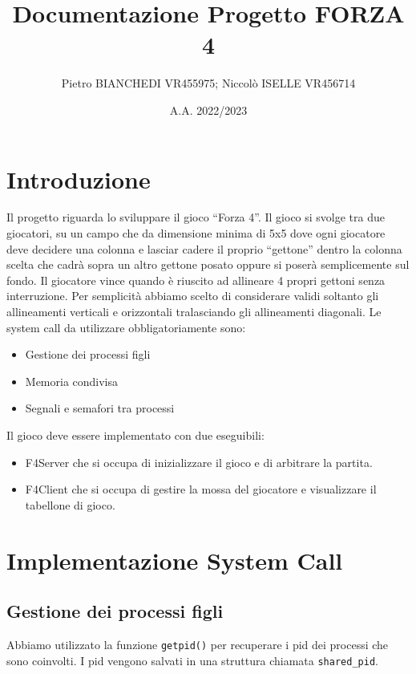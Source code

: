 \documentclass[a4paper,11pt]{article}
\begin{document}
\title{Documentazione Progetto FORZA 4}
\author{Pietro BIANCHEDI VR455975; Niccol\`o ISELLE VR456714}
\date{A.A. 2022/2023}
\maketitle

\section{Introduzione}

Il progetto riguarda lo sviluppare il gioco “Forza 4”. Il gioco si svolge tra due giocatori, su un campo che da dimensione minima di 5x5 dove ogni giocatore deve decidere
una colonna e lasciar cadere il proprio “gettone” dentro la colonna scelta che cadrà sopra un altro gettone posato oppure si poserà semplicemente sul fondo. Il giocatore
vince quando è riuscito ad allineare 4 propri gettoni senza interruzione. Per semplicità abbiamo scelto di considerare validi soltanto gli allineamenti verticali e orizzontali
tralasciando gli allineamenti diagonali.
Le system call da utilizzare obbligatoriamente sono:
\begin{itemize}
\item Gestione dei processi figli
\item Memoria condivisa
\item Segnali e semafori tra processi
\end{itemize}
Il gioco deve essere implementato con due eseguibili:
\begin{itemize}
\item F4Server che si occupa di inizializzare il gioco e di arbitrare la partita.
\item F4Client che si occupa di gestire la mossa del giocatore e visualizzare il tabellone di gioco.
\end{itemize}

\section{Implementazione System Call}

\subsection{Gestione dei processi figli}

Abbiamo utilizzato la funzione \texttt{getpid()} per recuperare i pid dei processi che sono coinvolti. I pid vengono salvati in una struttura chiamata \texttt{shared\_pid}.
\end{document}
